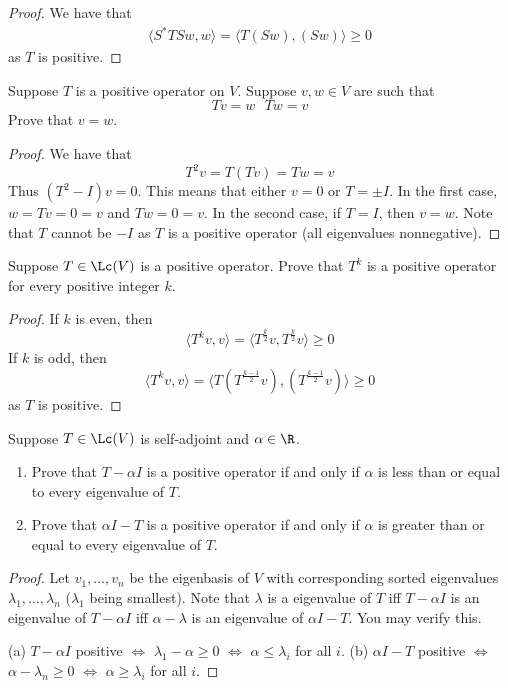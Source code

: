 \documentclass{extarticle}
\begin{document}
\begin{proof}
We have that
\begin{align*}
    \langle S^*TS w,w \rangle
    = \langle T(Sw), (Sw) \rangle \geq 0
\end{align*}
as \(T\) is positive.
\end{proof}

\begin{problem}{10}
    Suppose \(T\) is a positive operator on \(V\). Suppose \(v, w \in V\) are such that
    \[Tv = w \ \ \ Tw = v\]
    Prove that \(v = w\).
\end{problem}

\begin{proof}
We have that
\[T^2 v = T(Tv) = Tw = v\]
Thus \((T^2 - I)v = 0\). This means that either \(v = 0\) or \(T = \pm I\). In the first case,
\(w = Tv = 0 = v\) and \(Tw = 0 = v\). In the second case, if \(T = I\), then \(v = w\). Note that
\(T\) cannot be \(-I\) as \(T\) is a positive operator (all eigenvalues nonnegative).
\end{proof}

\begin{problem}{12}
    Suppose \(T \in \Lc(V)\) is a positive operator. Prove that \(T^k\) is a positive operator
    for every positive integer \(k\).
\end{problem}

\begin{proof}
If \(k\) is even, then
\[\langle T^k v,v \rangle = \langle T^{\frac{k}{2}}v,T^{\frac{k}{2}}v \rangle \geq 0\]
If \(k\) is odd, then
\[\langle T^k v,v \rangle = \langle T(T^{\frac{k-1}{2}}v), (T^{\frac{k-1}{2}}v) \rangle \geq 0\]
as \(T\) is positive.
\end{proof}

\begin{problem}{13}
    Suppose \(T \in \Lc(V)\) is self-adjoint and \(\alpha \in \R\).
    \begin{enumerate}[label=(\alph*)]
        \item Prove that \(T - \alpha I\) is a positive operator if and only if \(\alpha\) is less
        than or equal to every eigenvalue of \(T\).
        \item Prove that \(\alpha I - T\) is a positive operator if and only if \(\alpha\) is
        greater than or equal to every eigenvalue of \(T\).
    \end{enumerate}
\end{problem}

\begin{proof}
Let \(v_1, \ldots, v_n\) be the eigenbasis of \(V\) with corresponding sorted eigenvalues \(\lambda_1,
\ldots, \lambda_n\) (\(\lambda_1\) being smallest). Note that \(\lambda\) is a eigenvalue of \(T\) iff \(T- \alpha I\) is
an eigenvalue of \(T - \alpha I\) iff \(\alpha - \lambda\) is an eigenvalue of \(\alpha I - T\). You
may verify this.

(a) \(T - \alpha I\) positive \(\Longleftrightarrow\) \(\lambda_1 - \alpha \geq 0\)
\(\Longleftrightarrow\) \(\alpha \leq \lambda_i\) for all \(i\).
(b) \(\alpha I  -T\) positive \(\Longleftrightarrow\) \(\alpha - \lambda_n \geq 0\)
\(\Longleftrightarrow\) \(\alpha \geq \lambda_i\) for all \(i\).
\end{proof}
\end{document}
